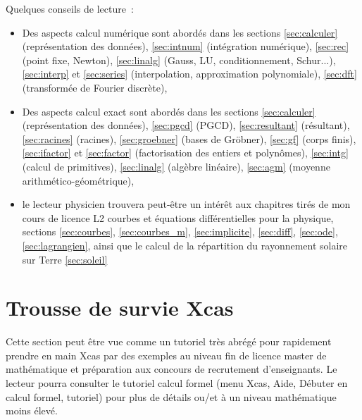 \documentclass[a4paper,11pt]{article}
\begin{document}
\begin{giacjshere}
Quelques conseils de lecture~:
\begin{itemize}
\item Des aspects calcul num\'erique sont abord\'es dans les sections
\ref{sec:calculer} (repr\'esentation des donn\'ees), 
\ref{sec:intnum} (int\'egration num\'erique),
\ref{sec:rec} (point fixe, Newton), \ref{sec:linalg} (Gauss, LU,
conditionnement, Schur...), \ref{sec:interp} et \ref{sec:series}
(interpolation, approximation polynomiale),
\ref{sec:dft} (transform\'ee de Fourier discr\`ete),
\item Des aspects calcul exact sont abord\'es dans les sections
\ref{sec:calculer} (repr\'esentation des donn\'ees), 
\ref{sec:pgcd} (PGCD), \ref{sec:resultant}
(r\'esultant), \ref{sec:racines} (racines), \ref{sec:groebner}
(bases de Gr\"obner), \ref{sec:gf} (corps
finis), \ref{sec:ifactor}
et \ref{sec:factor} (factorisation des entiers et polyn\^omes),
\ref{sec:intg} (calcul de primitives), \ref{sec:linalg} (alg\`ebre
lin\'eaire), \ref{sec:agm} (moyenne
arithm\'etico-g\'eom\'etrique), 
\item le lecteur physicien trouvera peut-\^etre un int\'er\^et
aux chapitres tir\'es de mon cours de licence L2 courbes et
\'equations diff\'erentielles pour la physique,
sections \ref{sec:courbes},
\ref{sec:courbes_m}, \ref{sec:implicite}, \ref{sec:diff},
\ref{sec:ode}, \ref{sec:lagrangien}, ainsi que le calcul de la
r\'epartition du rayonnement solaire sur Terre \ref{sec:soleil}
\end{itemize}
\printindex


\pagebreak

\section{Trousse de survie Xcas} \label{sec:survie}
Cette section peut \^etre vue comme un tutoriel tr\`es abr\'eg\'e 
pour rapidement
prendre en main Xcas par des exemples au niveau fin de licence
master de math\'ematique et pr\'eparation aux concours de recrutement
d'enseignants. Le lecteur pourra consulter le tutoriel calcul
formel (menu Xcas, Aide, D\'ebuter en calcul formel, tutoriel) pour
plus de d\'etails ou/et \`a un niveau math\'ematique moins \'elev\'e.


\end{giacjshere}
\end{document}
